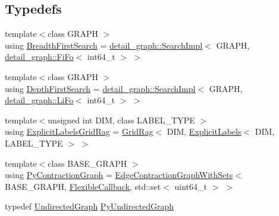 \subsection*{Typedefs}
\begin{DoxyCompactItemize}
\item 
{\footnotesize template$<$class G\+R\+A\+P\+H $>$ }\\using \hyperlink{namespacenifty_1_1graph_a5cdea7eb940a178738d5f7ba11b92a15}{Breadth\+First\+Search} = \hyperlink{classnifty_1_1graph_1_1detail__graph_1_1SearchImpl}{detail\+\_\+graph\+::\+Search\+Impl}$<$ G\+R\+A\+P\+H, \hyperlink{structnifty_1_1graph_1_1detail__graph_1_1FiFo}{detail\+\_\+graph\+::\+Fi\+Fo}$<$ int64\+\_\+t $>$ $>$
\item 
{\footnotesize template$<$class G\+R\+A\+P\+H $>$ }\\using \hyperlink{namespacenifty_1_1graph_a3d6d4a5216a5d0a11785373bc7537085}{Depth\+First\+Search} = \hyperlink{classnifty_1_1graph_1_1detail__graph_1_1SearchImpl}{detail\+\_\+graph\+::\+Search\+Impl}$<$ G\+R\+A\+P\+H, \hyperlink{structnifty_1_1graph_1_1detail__graph_1_1LiFo}{detail\+\_\+graph\+::\+Li\+Fo}$<$ int64\+\_\+t $>$ $>$
\item 
{\footnotesize template$<$unsigned int D\+I\+M, class L\+A\+B\+E\+L\+\_\+\+T\+Y\+P\+E $>$ }\\using \hyperlink{namespacenifty_1_1graph_a45cca2dcd061996d13ec8e6bb8afb200}{Explicit\+Labels\+Grid\+Rag} = \hyperlink{classnifty_1_1graph_1_1GridRag}{Grid\+Rag}$<$ D\+I\+M, \hyperlink{classnifty_1_1graph_1_1ExplicitLabels}{Explicit\+Labels}$<$ D\+I\+M, L\+A\+B\+E\+L\+\_\+\+T\+Y\+P\+E $>$ $>$
\item 
{\footnotesize template$<$class B\+A\+S\+E\+\_\+\+G\+R\+A\+P\+H $>$ }\\using \hyperlink{namespacenifty_1_1graph_aa9ab054f2ea0df09d60d6adf1c7ee6b3}{Py\+Contraction\+Graph} = \hyperlink{classnifty_1_1graph_1_1EdgeContractionGraphWithSets}{Edge\+Contraction\+Graph\+With\+Sets}$<$ B\+A\+S\+E\+\_\+\+G\+R\+A\+P\+H, \hyperlink{structnifty_1_1graph_1_1FlexibleCallback}{Flexible\+Callback}, std\+::set$<$ uint64\+\_\+t $>$ $>$
\item 
typedef \hyperlink{classnifty_1_1graph_1_1UndirectedGraph}{Undirected\+Graph} \hyperlink{namespacenifty_1_1graph_a62ff5304d118f627910196adc6ab7aab}{Py\+Undirected\+Graph}
\end{DoxyCompactItemize}
